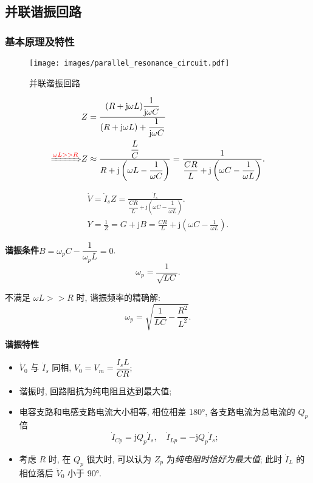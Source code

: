\subsection{并联谐振回路} \label{并联谐振回路}
\subsubsection{基本原理及特性}

\begin{figure}[H]
    \centering
    \texttt{[image: images/parallel\_resonance\_circuit.pdf]}
    \caption{并联谐振回路}
\end{figure}

\rmg
\begin{subequations}
    \begin{align}
                                                & Z=\frac{(R+\mathrm{j}\omega L)\dfrac{1}{\mathrm{j}\omega C}}{(R+\mathrm{j}\omega L)+\dfrac{1}{\mathrm{j}\omega C}}                                              \\
        \xRightarrow{{\color{red} \omega L>>R}} & Z\approx\frac{\dfrac{L}{C}}{R+\mathrm{j}\left(\omega L-\dfrac{1}{\omega C}\right)}=\frac{1}{\dfrac{CR}{L}+\mathrm{j}\left(\omega C-\dfrac{1}{\omega L}\right)}.
    \end{align}
\end{subequations}

\srmg
\begin{gather}
    \dot{V}=\dot{I}_sZ=\frac{\dot{I}_s}{\dfrac{CR}{L}+\mathrm{j}\left(\omega C-\dfrac{1}{\omega L}\right)}. \\
    Y=\frac{1}{Z}=G+\mathrm{j}B=\frac{CR}{L}+\mathrm{j}\left(\omega C-\frac{1}{\omega L}\right).
\end{gather}

\textbf{谐振条件}\quad $B=\omega_pC-\dfrac{1}{\omega_p L}=0$.
\begin{equation}
    \omega_p=\frac{1}{\sqrt{LC}}.
\end{equation}

不满足 $\omega L>>R$ 时, 谐振频率的精确解:
\begin{equation}
    \omega_p=\sqrt{\frac{1}{LC}-\frac{R^2}{L^2}}.
\end{equation}

\textbf{谐振特性}

\begin{itemize}
    \item $\dot{V}_0$ 与 $\dot{I}_s$ 同相, $V_0=V_m=\dfrac{I_sL}{CR}$;
    \item 谐振时, 回路阻抗为纯电阻且达到最大值;
    \item 电容支路和电感支路电流大小相等, 相位相差 180°, 各支路电流为总电流的 $Q_p$ 倍
          \begin{equation}
              \dot{I}_{Cp}=\mathrm{j}Q_p\dot{I}_s,\quad\dot{I}_{Lp}=-\mathrm{j}Q_p\dot{I}_s;
          \end{equation}
    \item 考虑 $R$ 时, 在 $Q_p$ 很大时, 可以认为 $Z_p$ 为\textit{纯电阻时恰好为最大值}; 此时 $\dot{I}_L$ 的相位落后 $\dot{V}_0$ 小于 90°.
\end{itemize}

